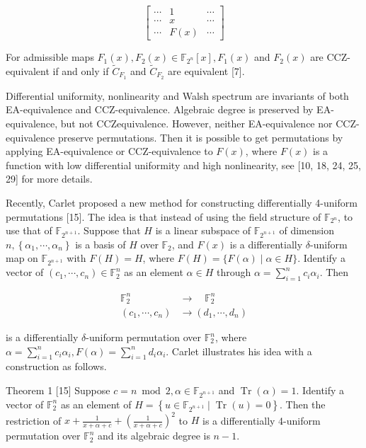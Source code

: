\documentclass[10pt]{article}
\begin{document}
$$
\left[\begin{array}{ccc}
\cdots & 1 & \cdots \\
\cdots & x & \cdots \\
\cdots & F(x) & \cdots
\end{array}\right]
$$

For admissible maps $F_{1}(x), F_{2}(x) \in \mathbb{F}_{2^{n}}[x], F_{1}(x)$ and $F_{2}(x)$ are CCZ-equivalent if and only if $\tilde{C}_{F_{1}}$ and $\tilde{C}_{F_{2}}$ are equivalent [7].

Differential uniformity, nonlinearity and Walsh spectrum are invariants of both EA-equivalence and CCZ-equivalence. Algebraic degree is preserved by EA-equivalence, but not CCZequivalence. However, neither EA-equivalence nor CCZ-equivalence preserve permutations. Then it is possible to get permutations by applying EA-equivalence or CCZ-equivalence to $F(x)$, where $F(x)$ is a function with low differential uniformity and high nonlinearity, see [10, 18, 24, 25, 29] for more details.

Recently, Carlet proposed a new method for constructing differentially 4-uniform permutations [15]. The idea is that instead of using the field structure of $\mathbb{F}_{2^{n}}$, to use that of $\mathbb{F}_{2^{n+1}}$. Suppose that $H$ is a linear subspace of $\mathbb{F}_{2^{n+1}}$ of dimension $n,\left\{\alpha_{1}, \cdots, \alpha_{n}\right\}$ is a basis of $H$ over $\mathbb{F}_{2}$, and $F(x)$ is a differentially $\delta$-uniform map on $\mathbb{F}_{2^{n+1}}$ with $F(H)=H$, where $F(H)=\{F(\alpha) \mid \alpha \in H\}$. Identify a vector of $\left(c_{1}, \cdots, c_{n}\right) \in \mathbb{F}_{2}^{n}$ as an element $\alpha \in H$ through $\alpha=\sum_{i=1}^{n} c_{i} \alpha_{i}$. Then

$$
\begin{aligned}
\mathbb{F}_{2}^{n} & \rightarrow \quad \mathbb{F}_{2}^{n} \\
\left(c_{1}, \cdots, c_{n}\right) & \rightarrow\left(d_{1}, \cdots, d_{n}\right)
\end{aligned}
$$

is a differentially $\delta$-uniform permutation over $\mathbb{F}_{2}^{n}$, where $\alpha=\sum_{i=1}^{n} c_{i} \alpha_{i}, F(\alpha)=\sum_{i=1}^{n} d_{i} \alpha_{i}$. Carlet illustrates his idea with a construction as follows.

Theorem 1 [15] Suppose $c=n \bmod 2, \alpha \in \mathbb{F}_{2^{n+1}}$ and $\operatorname{Tr}(\alpha)=1$. Identify a vector of $\mathbb{F}_{2}^{n}$ as an element of $H=\left\{u \in \mathbb{F}_{2^{n+1}} \mid \operatorname{Tr}(u)=0\right\}$. Then the restriction of $x+\frac{1}{x+\alpha+c}+\left(\frac{1}{x+\alpha+c}\right)^{2}$ to $H$ is a differentially 4-uniform permutation over $\mathbb{F}_{2}^{n}$ and its algebraic degree is $n-1$.
\end{document}
